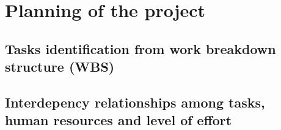 \section{Planning of the project}

\subsection{Tasks identification from work breakdown structure (WBS)}


\pagebreak


\subsection{Interdepency relationships among tasks, human resources and level of effort}



